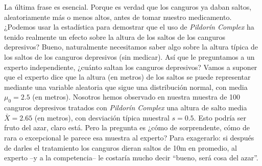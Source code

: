 \begin{itemize}
\begin{enumerate}
        \end{enumerate}
        La última frase es esencial. Porque es verdad que los canguros ya daban saltos, aleatoriamente más o menos altos, antes de tomar nuestro medicamento. ¿Podemos usar la estadística para demostrar que el uso de {\em {\em Pildorín Complex}} ha tenido realmente un efecto sobre la altura de los saltos de los canguros depresivos? Bueno, naturalmente necesitamos saber algo sobre la altura típica de los saltos de los canguros depresivos (sin medicar). Así que le preguntamos a un experto independiente, ¿cuánto saltan los canguros depresivos? Vamos a suponer que el experto dice que la altura (en metros) de los saltos se puede representar mediante una variable aleatoria que sigue una distribución normal, con media $\mu_0=2.5$ (en metros). Nosotros hemos observado en nuestra muestra de 100 canguros depresivos tratados con {\em {\em Pildorín Complex}} una altura de salto media $\bar X=2.65$ (en metros), con desviación típica muestral $s=0.5$. Esto podría ser fruto del azar, claro está. Pero la pregunta es ¿cómo de sorprendente, cómo de rara o excepcional le parece esa muestra al experto? Para exagerarlo: si después de darles el tratamiento los canguros dieran saltos de 10m en promedio, al experto --y a la competencia-- le costaría mucho decir ``bueno, será cosa del azar''.


\end{itemize}
